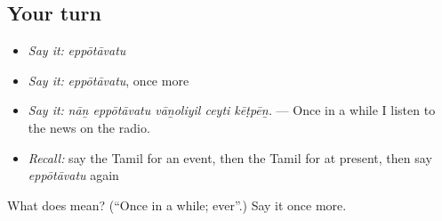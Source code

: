 \subsection*{Your turn}
\begin{itemize}
\raggedright
  \item \emph{Say it:} \emph{eppōtāvatu}
  \item \emph{Say it:} \emph{eppōtāvatu}, once more
  \item \emph{Say it:} \emph{nāṉ eppōtāvatu vāṉoliyil ceyti kēṭpēṉ.} — Once in a while I listen to the news on the radio.
  \item \emph{Recall:} say the Tamil for an event, then the Tamil for at present, then say \emph{eppōtāvatu} again
\end{itemize}

\begin{tcolorbox}[breakable,colback=teal!4,colframe=teal!35!black,title={Before you move on}]
What does  mean? (\textquotedblleft{}Once in a while; ever\textquotedblright{}.) Say it once more.
\end{tcolorbox}

